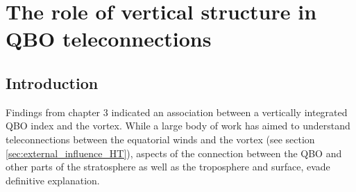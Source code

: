 \chapter{The role of vertical structure in QBO teleconnections}
\label{cha:deepQBO}

\section{Introduction}
\label{sec:deepQBO-introduction}

Findings from chapter 3 indicated an association between a vertically integrated QBO index and the vortex. While a large body of work has aimed to understand teleconnections between the equatorial winds and the vortex (see section \ref{sec:external_influence_HT}), aspects of the connection between the QBO and other parts of the stratosphere as well as the troposphere and surface, evade definitive explanation.

